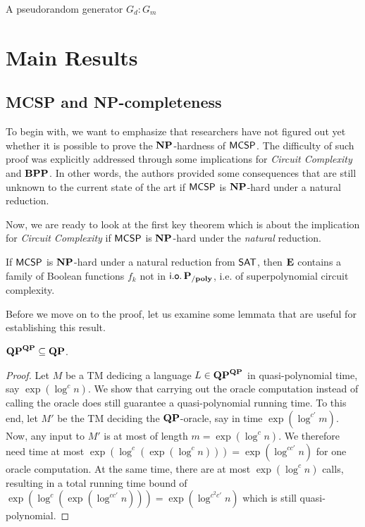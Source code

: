 \documentclass[11pt]{article}
\begin{document}
\begin{definition}
  A pseudorandom generator $G_d \colon G_m$
\end{definition}




\section{Main Results}

\subsection{MCSP and NP-completeness}
\label{subsect:MCSP-NP}

To begin with, we want to emphasize that researchers have not figured out yet whether it is possible to prove the $\mathbf{NP}$-hardness of $\mathsf{MCSP}$.
The difficulty of such proof was explicitly addressed through some implications for \textit{Circuit Complexity} and $\mathbf{BPP}$. In other words, the authors provided some consequences that are still unknown to the current state of the art if $\mathsf{MCSP}$ is $\mathbf{NP}$-hard under a natural reduction.

Now, we are ready to look at the first key theorem which is about the implication for \textit{Circuit Complexity} if $\mathsf{MCSP}$ is $\mathbf{NP}$-hard under the \textit{natural} reduction.

\begin{theorem}[\cite{10.1145/335305.335314}]
  \label{thm:15-1}
  If $\mathsf{MCSP}$ is $\mathbf{NP}$-hard under a natural reduction from
  $\mathsf{SAT}$, then $\mathbf{E}$ contains a family of Boolean functions
  $f_k$ not in $\mathsf{i.o.}\, \mathbf{P_{/poly}}$, i.e. of superpolynomial circuit complexity.
\end{theorem}

Before we move on to the proof, let us examine some lemmata that are useful
for establishing this result.

\begin{lemma}
	\label{lem:qp-collapse}
	$\mathbf{QP}^{\mathbf{QP}} \subseteq \mathbf{QP}$.
\end{lemma}

\begin{proof}
  Let $M$ be a TM dedicing a language $L \in \mathbf{QP}^{\mathbf{QP}}$ in
  quasi-polynomial time, say $\exp(\log^c n)$.
  We show that carrying out the oracle computation instead of calling the
  oracle does still guarantee a quasi-polynomial running time. To this end,
  let $M'$ be the TM deciding the $\mathbf{QP}$-oracle, say in time
  $\exp(\log^{c'} m)$.
  Now, any input to $M'$ is at most of length $m = \exp(\log^c n)$. We
  therefore need time at most
  $\exp(\log^c (\exp(\log^c n))) = \exp(\log^{cc'} n)$
  for one oracle computation. At the same time, there are at most
  $\exp(\log^c n)$ calls, resulting in a total running time bound of
  $\exp(\log^c (\exp(\log^{cc'} n))) = \exp(\log^{c^2 c'} n)$
  which is still quasi-polynomial.
\end{proof}
\end{document}
